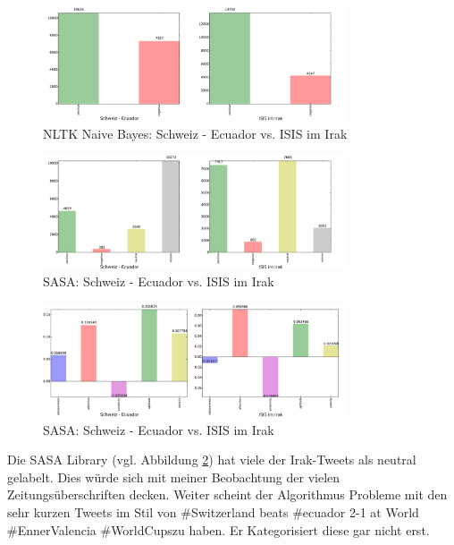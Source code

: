 \begin{figure}[H]
  \centering
  \includegraphics[width=0.8\textwidth]{images/schweizvsirak_nltk.pdf}
  \caption[NLTK Naive Bayes: Schweiz - Ecuador vs. ISIS im Irak]{NLTK Naive Bayes: Schweiz - Ecuador vs. ISIS im Irak}
  \label{fig:naivebayesanalysis}
\end{figure}

\begin{figure}[H]
  \centering
  \includegraphics[width=0.8\textwidth]{images/schweizvsirak_sasa.pdf}
  \caption[SASA: Schweiz - Ecuador vs. ISIS im Irak]{SASA: Schweiz - Ecuador vs. ISIS im Irak}
  \label{fig:sasaanalysis}
\end{figure}

\begin{figure}[H]
  \centering
  \includegraphics[width=0.8\textwidth]{images/schweizvsirak_senticnet.pdf}
  \caption[SenticNet: Schweiz - Ecuador vs. ISIS im Irak]{SASA: Schweiz - Ecuador vs. ISIS im Irak}
  \label{fig:senticnetanalysis}
\end{figure}

Die SASA Library (vgl. Abbildung \ref{fig:sasaanalysis}) hat viele der Irak-Tweets als neutral gelabelt. Dies würde sich mit meiner Beobachtung der vielen Zeitungsüberschriften decken. Weiter scheint der Algorithmus Probleme mit den sehr kurzen Tweets im Stil von \flqq \#Switzerland beats \#ecuador 2-1 at World \#EnnerValencia \#WorldCups\frqq zu haben. Er Kategorisiert diese gar nicht erst. 

